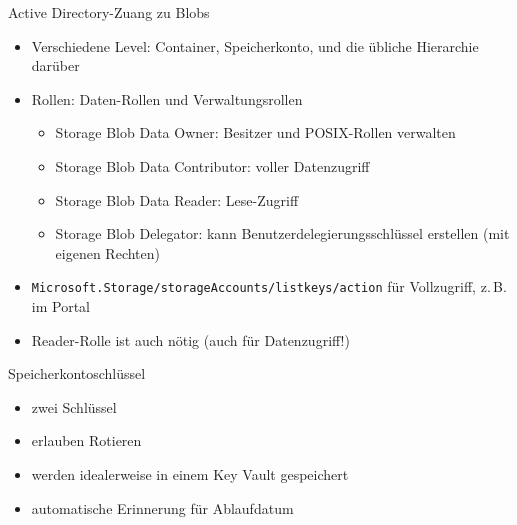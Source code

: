 \begin{flashcard}[Definition]{Active Directory-Zuang zu Blobs}
  \begin{itemize}
    \item Verschiedene Level: Container, Speicherkonto,\newline
      und die übliche Hierarchie darüber
    \item Rollen: Daten-Rollen und Verwaltungsrollen
      \begin{itemize}
        \item Storage Blob Data Owner: Besitzer und POSIX-Rollen verwalten
        \item Storage Blob Data Contributor: voller Datenzugriff
        \item Storage Blob Data Reader: Lese-Zugriff
        \item Storage Blob Delegator: kann Benutzerdelegierungsschlüssel erstellen\newline
        (mit eigenen Rechten)
      \end{itemize}
    \item \texttt{Microsoft.Storage/storageAccounts/listkeys/action} für Vollzugriff, z.\,B. im Portal
    \item Reader-Rolle ist auch nötig (auch für Datenzugriff!)
  \end{itemize}
\end{flashcard}

\begin{flashcard}[Definition]{Speicherkontoschlüssel}
  \begin{itemize}
    \item zwei Schlüssel
    \item erlauben Rotieren
    \item werden idealerweise in einem Key Vault gespeichert
    \item automatische Erinnerung für Ablaufdatum
  \end{itemize}
\end{flashcard}

